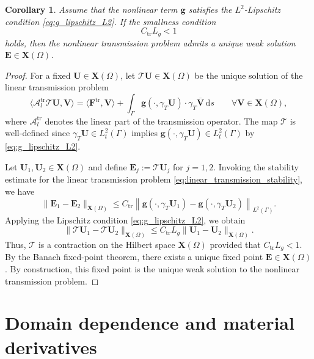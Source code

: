 \documentclass[10pt,a4paper]{amsart}
\newtheorem{coro}[theo]{Corollary}
\numberwithin{equation}{section}
\begin{document}
\begin{coro}
\label{th:existence_ntc}
Assume that the nonlinear term $\mathbf{g}$ satisfies the $L^2$-Lipschitz condition \eqref{eq:g_lipschitz_L2}. If the smallness condition
\[
C_{\mathrm{tr}} L_g < 1
\]
holds, then the nonlinear transmission problem admits a unique weak solution $\mathbf{E} \in \mathbf{X}(\Omega)$.
\end{coro}

\begin{proof}
For a fixed $\mathbf{U} \in \mathbf{X}(\Omega)$, let $\mathcal{T}\mathbf{U} \in \mathbf{X}(\Omega)$ be the unique solution of the linear transmission problem
\[
\langle \mathscr {A}_l^{\mathrm{tr}} \mathcal{T}\mathbf{U}, \mathbf{V} \rangle = \langle \mathbf{F}^{\mathrm{tr}}, \mathbf{V} \rangle + \int_{\Gamma} \mathbf{g}(\cdot, \gamma_T \mathbf{U}) \cdot \gamma_T \overline{\mathbf{V}} \,\mathrm{d}s \qquad \forall \mathbf{V} \in \mathbf{X}(\Omega),
\]
where $\mathscr {A}_l^{\mathrm{tr}}$ denotes the linear part of the transmission operator. The map $\mathcal{T}$ is well-defined since $\gamma_T \mathbf{U} \in L_t^2(\Gamma)$ implies $\mathbf{g}(\cdot, \gamma_T \mathbf{U}) \in L_t^2(\Gamma)$ by \eqref{eq:g_lipschitz_L2}.

Let $\mathbf{U}_1, \mathbf{U}_2 \in \mathbf{X}(\Omega)$ and define $\mathbf{E}_j := \mathcal{T}\mathbf{U}_j$ for $j=1,2$. Invoking the stability estimate for the linear transmission problem \eqref{eq:linear_transmission_stability}, we have
\[
\|\mathbf{E}_1 - \mathbf{E}_2\|_{\mathbf{X}(\Omega)} \le C_{\mathrm{tr}} \left\| \mathbf{g}(\cdot, \gamma_T \mathbf{U}_1) - \mathbf{g}(\cdot, \gamma_T \mathbf{U}_2) \right\|_{L^2(\Gamma)}.
\]
Applying the Lipschitz condition \eqref{eq:g_lipschitz_L2}, we obtain
\[
\|\mathcal{T}\mathbf{U}_1 - \mathcal{T}\mathbf{U}_2\|_{\mathbf{X}(\Omega)} \le C_{\mathrm{tr}} L_g \|\mathbf{U}_1 - \mathbf{U}_2\|_{\mathbf{X}(\Omega)}.
\]
Thus, $\mathcal{T}$ is a contraction on the Hilbert space $\mathbf{X}(\Omega)$ provided that $C_{\mathrm{tr}} L_g < 1$. By the Banach fixed-point theorem, there exists a unique fixed point $\mathbf{E} \in \mathbf{X}(\Omega)$. By construction, this fixed point is the unique weak solution to the nonlinear transmission problem.
\end{proof}


\section{Domain dependence and material derivatives}
\label{sec:3}
\end{document}

